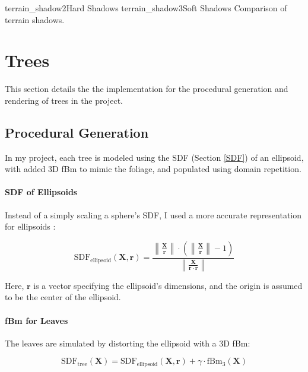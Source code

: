 
{terrain_shadow2}{Hard Shadows}
{terrain_shadow3}{Soft Shadows}
{Comparison of terrain shadows.}

\section{Trees}

This section details the the implementation for the procedural generation and rendering of trees in the project.

\subsection{Procedural Generation}
\label{Tree Procedural Generation}

In my project, each tree is modeled using the SDF (Section \ref{SDF}) of an ellipsoid, with added 3D fBm to mimic the foliage, and populated using domain repetition. 

\paragraph{SDF of Ellipsoids}
Instead of a simply scaling a sphere's SDF, I used a more accurate representation for ellipsoids \cite{quilez_ellipsoid_nodate}:

\begin{equation}
\text{SDF}_\text{ellipsoid}(\mathbf{X}, \mathbf{r}) = \frac{\left\|\frac{\mathbf{X}}{\mathbf{r}}\right\| \cdot \left(\left\|\frac{\mathbf{X}}{\mathbf{r}}\right\| - 1\right)}{\left\|\frac{\mathbf{X}}{\mathbf{r} \cdot \mathbf{r}}\right\|}
\end{equation}

Here, $\mathbf{r}$ is a vector specifying the ellipsoid's dimensions, and the origin is assumed to be the center of the ellipsoid.

\paragraph{fBm for Leaves}
The leaves are simulated by distorting the ellipsoid with a 3D fBm:

\begin{equation}
\text{SDF}_\text{tree}(\mathbf{X}) = \text{SDF}_\text{ellipsoid}(\mathbf{X}, \mathbf{r}) + \gamma \cdot \text{fBm}_3(\mathbf{X})
\end{equation}


